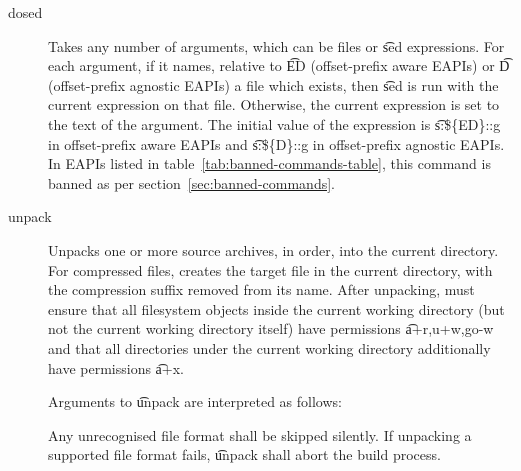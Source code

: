 \begin{description}
\item[dosed] Takes any number of arguments, which can be files or \t{sed} expressions. For each
    argument, if it names, relative to \t{ED} (offset-prefix aware EAPIs) or \t{D} (offset-prefix
    agnostic EAPIs) a file which exists, then \t{sed} is run with the current expression on that
    file. Otherwise, the current expression is set to the text of the argument. The initial value
    of the expression is \t{s:\$\{ED\}::g} in offset-prefix aware EAPIs and \t{s:\$\{D\}::g} in
    offset-prefix agnostic EAPIs. In EAPIs listed in table~\ref{tab:banned-commands-table}, this
    command is banned as per section~\ref{sec:banned-commands}.

\item[unpack] Unpacks one or more source archives, in order, into the current directory.
    For compressed files, creates the target file in the current directory, with the compression
    suffix removed from its name. After unpacking, must ensure that all filesystem objects inside
    the current working directory (but not the current working directory itself) have permissions
    \t{a+r,u+w,go-w} and that all directories under the current working directory additionally have
    permissions \t{a+x}.

    Arguments to \t{unpack} are interpreted as follows:

    Any unrecognised file format shall be skipped silently. If unpacking a supported file format
    fails, \t{unpack} shall abort the build process.


\end{description}
